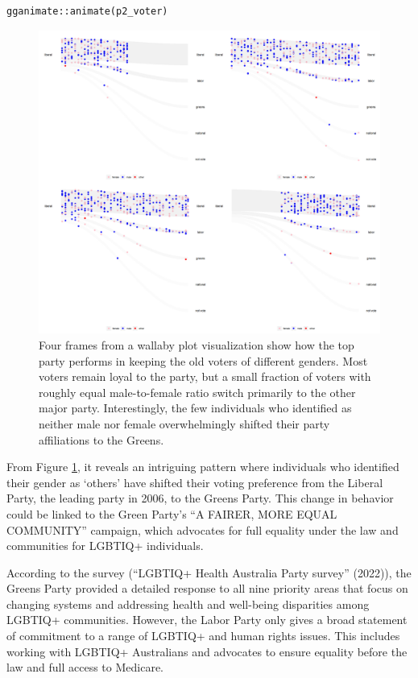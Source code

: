 \begin{verbatim}
gganimate::animate(p2_voter)
\end{verbatim}

\begin{figure}

{\centering \includegraphics[width=1\linewidth]{figures/animation-voter} 

}

\caption{Four frames from a wallaby plot visualization show how the top party performs in keeping the old voters of different genders. Most voters remain loyal to the party, but a small fraction of voters with roughly equal male-to-female ratio switch primarily to the other major party. Interestingly, the few individuals who identified as neither male nor female overwhelmingly shifted their party affiliations to the Greens.}\label{fig:voter-figure}
\end{figure}

From Figure \ref{fig:voter-figure}, it reveals an intriguing pattern where individuals who identified their gender as `others' have shifted their voting preference from the Liberal Party, the leading party in 2006, to the Greens Party. This change in behavior could be linked to the Green Party's ``A FAIRER, MORE EQUAL COMMUNITY'' campaign, which advocates for full equality under the law and communities for LGBTIQ+ individuals.

According to the survey ({``{LGBTIQ+ Health Australia Party survey}''} (2022)), the Greens Party provided a detailed response to all nine priority areas that focus on changing systems and addressing health and well-being disparities among LGBTIQ+ communities. However, the Labor Party only gives a broad statement of commitment to a range of LGBTIQ+ and human rights issues. This includes working with LGBTIQ+ Australians and advocates to ensure equality before the law and full access to Medicare.

